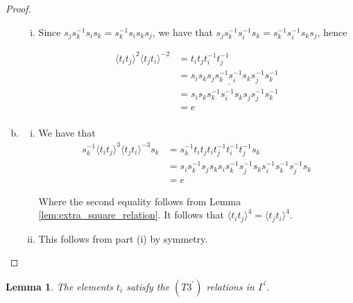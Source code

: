 \documentclass[11pt]{amsart}
\newtheorem{lem}[thm]{Lemma}
\theoremstyle{definition}
\begin{document}
\begin{proof}
\begin{enumerate}[a)]
\begin{enumerate}[i)]
\item Since $s_js_k^{-1}s_is_k = s_k^{-1}s_is_ks_j$, we have that $s_js_k^{-1}s_i^{-1}s_k = s_k^{-1}s_i^{-1}s_ks_j$, hence

\begin{align*}
\langle t_it_j \rangle^{2}\langle t_jt_i \rangle^{-2} &= t_it_jt_i^{-1}t_j^{-1}\\
&= s_is_k\underline{s_js_k^{-1}s_i^{-1}s_k}s_j^{-1}s_k^{-1}\\
&= s_is_ks_k^{-1}s_i^{-1}s_ks_js_j^{-1}s_k^{-1}\\
&= e\\
\end{align*}

\end{enumerate}
\item
\begin{enumerate}[i)]
\item We have that
\begin{align*}
s_k^{-1}\langle t_it_j \rangle^{3}\langle t_jt_i \rangle^{-3}s_k &= s_k^{-1}t_it_jt_it_j^{-1}t_i^{-1}t_j^{-1}s_k\\
&= s_is_k^{-1}s_js_ks_is_k^{-1}s_j^{-1}s_ks_i^{-1}s_k^{-1}s_j^{-1}s_k\\
&= e
\end{align*}

Where the second equality follows from Lemma \ref{lem:extra_square_relation}.  It follows that $\langle t_it_j \rangle^{4} = \langle t_jt_i \rangle^{4}$.

\item This follows from part (i) by symmetry.
\end{enumerate}
\end{enumerate}
\end{proof}



\begin{lem}\label{lem:r3_relations}
The elements $t_i$ satisfy the $(T3^\prime)$ relations in $\Gamma^\prime$.
\end{lem}
\end{document}
